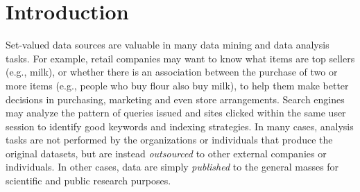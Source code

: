 \section{Introduction}
\label{sec:intro}
%
%
%
%
%


Set-valued data sources are valuable in many data mining and
data analysis tasks. For example, retail companies may want to know what
items are top sellers (e.g., milk), or whether there is an association
between the purchase of two or more items (e.g., people who buy flour also
buy milk), to help them make better decisions in purchasing, marketing and
even store arrangements. Search engines may analyze the pattern of queries
issued and sites clicked within the same user session to identify good
keywords and indexing strategies. In many cases, analysis tasks are not
performed by the organizations or individuals that produce the original
datasets, but are instead {\em outsourced} to other external companies or
individuals. In other cases, data are simply {\em published} to the general
masses for scientific and public research purposes.

